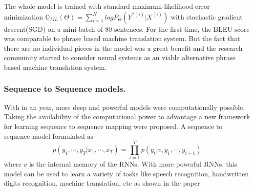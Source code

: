 \documentclass[conference]{IEEEtran}
\begin{document}
The whole model is trained with standard maximum-likelihood error minimization $\mathbb{O}_{ML}(\Theta) = \sum_{i=1}^N log P_\Theta(Y^{*(i)} | X^{(i)}) $ with stochastic gradient descent(SGD) on a mini-batch of 80 sentences. For the first time, the BLEU score was comparable to phrase based machine translation system. But the fact that there are no individual pieces in the model was a great benefit and the research community started to consider neural systems as an viable alternative phrase based machine translation system.


\subsubsection{Sequence to Sequence models.}
With in an year, more deep and powerful models were computationally possible. Taking the availability of the computational power to advantage a new framework for learning sequence to sequence mapping were proposed. A sequence to sequence model formulated as 
$$ p(y_1, \cdots, y_T| x_1, \cdots, x_T) = \prod_{t=1}^{T} p(y_t| v, y_1, \cdots, y_{t-1})$$
where $v$ is the internal memory of the RNNs. With more powerful RNNs, this model can be used to learn a variety of tasks like speech recognition, handwritten digits recognition, machine translation, etc as shown in the paper \cite{sutskever2014sequence}








\end{document}
